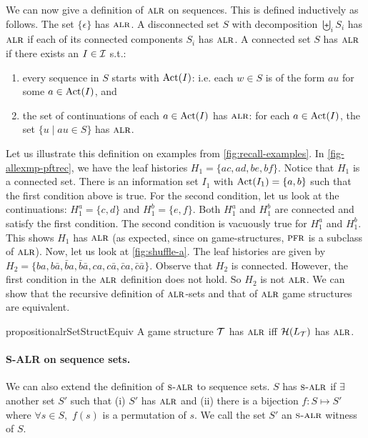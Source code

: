 We can now give a definition of $\textsc{alr}$ on sequences. This is defined
inductively as follows. The set $\{\epsilon\}$ has $\textsc{alr}$. A disconnected set
$S$ with decomposition $\biguplus_i S_i$ has $\textsc{alr}$ if each of
its connected components $S_i$ has $\textsc{alr}$. A connected set $S$ has
$\textsc{alr}$ if there exists an $I \in \mathcal{I}$ s.t.:
\begin{enumerate} \item every sequence in $S$ starts with $\operatorname{Act}(I)$: i.e. each
  $w \in S$ is of the form $a u$ for some $a \in \operatorname{Act}(I)$, and
\item the set of continuations of each $a \in \operatorname{Act}(I)$ has $\textsc{alr}$: for
  each $a \in \operatorname{Act}(I)$, the set $\{ u \mid au \in S\}$ has $\textsc{alr}$.
\end{enumerate}
Let us illustrate this definition on examples from
\cref{fig:recall-examples}. In \ref{fig-allexmp-pftrec}, we have the
leaf histories $H_1 = \{ac, ad, be, bf\}$. Notice that $H_1$ is a
connected set. There is an information set $I_1$ with
$\operatorname{Act}(I_1) = \{a, b\}$ such that the first condition above is
true. For the second condition, let us look at the continuations:
$H_1^a = \{c, d\}$ and $H_1^b = \{e, f\}$. Both $H_1^a$ and $H_1^b$
are connected and satisfy the first condition. The second condition is
vacuously true for $H_1^a$ and $H_1^b$. This shows $H_1$ has $\textsc{alr}$
(as expected, since on game-structures, $\textsc{pfr}$ is a subclass of
$\textsc{alr}$). Now, let us look at \cref{fig:shuffle-a}. The leaf
histories are given by $H_2 = \{ba,b\bar{a},\bar{b}a,\bar{b}\bar{a},ca,c\bar{a},\bar{c}a,\bar{c}\bar{a}\}$. Observe that
$H_2$ is connected. However, the first condition in the $\textsc{alr}$
definition does not hold. So $H_2$ is not $\textsc{alr}$. We can show that the recursive
definition of $\textsc{alr}$-sets and that of $\textsc{alr}$ game structures are equivalent.

\begin{restatable}{proposition}{alrSetStructEquiv}\label{prop:alr-set-struct-equiv}
  A game structure $\mathcal{T}$ has $\textsc{alr}$ iff $\mathcal{H}(L_{\mathcal{T}})$ has $\textsc{alr}$.
\end{restatable}


              
           

        
     

  
\paragraph*{S-ALR on sequence sets.} We can also extend the
definition of $\textsc{s-alr}$ to sequence sets.  $S$ has $\textsc{s-alr}$ if $\exists$
another set $S'$ such that (i) $S'$ has $\textsc{alr}$ and (ii) there is a
bijection $f : S \mapsto S'$ where $\forall s \in S,$ $f(s)$ is a
permutation of $s$. We call the set $S'$ an $\textsc{s-alr}$ witness of $S$.

